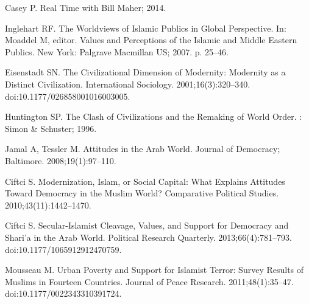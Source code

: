 \documentclass[10pt,letterpaper]{article}
\begin{document}
%
%
% 
%
\begin{thebibliography}{10}

Casey P. Real {{Time}} with {{Bill Maher}}; 2014.

Inglehart RF.
\newblock The {{Worldviews}} of {{Islamic Publics}} in {{Global Perspective}}.
\newblock In: Moaddel M, editor. Values and {{Perceptions}} of the {{Islamic}}
  and {{Middle Eastern Publics}}. {New York}: {Palgrave Macmillan US}; 2007. p.
  25--46.

Eisenstadt SN.
\newblock The {{Civilizational Dimension}} of {{Modernity}}: {{Modernity}} as a
  {{Distinct Civilization}}.
\newblock International Sociology. 2001;16(3):320--340.
\newblock doi:{10.1177/026858001016003005}.

Huntington SP.
\newblock The {{Clash}} of {{Civilizations}} and the {{Remaking}} of {{World
  Order}}.
: {Simon \& Schuster}; 1996.

Jamal A, Tessler M.
\newblock Attitudes in the {{Arab World}}.
\newblock Journal of Democracy; Baltimore. 2008;19(1):97--110.

Ciftci S.
\newblock Modernization, {{Islam}}, or {{Social Capital}}: {{What Explains
  Attitudes Toward Democracy}} in the {{Muslim World}}?
\newblock Comparative Political Studies. 2010;43(11):1442--1470.

Ciftci S.
\newblock Secular-{{Islamist Cleavage}}, {{Values}}, and {{Support}} for
  {{Democracy}} and {{Shari}}'a in the {{Arab World}}.
\newblock Political Research Quarterly. 2013;66(4):781--793.
\newblock doi:{10.1177/1065912912470759}.

Mousseau M.
\newblock Urban Poverty and Support for {{Islamist}} Terror: {{Survey}} Results
  of {{Muslims}} in Fourteen Countries.
\newblock Journal of Peace Research. 2011;48(1):35--47.
\newblock doi:{10.1177/0022343310391724}.


\end{thebibliography}
\end{document}

